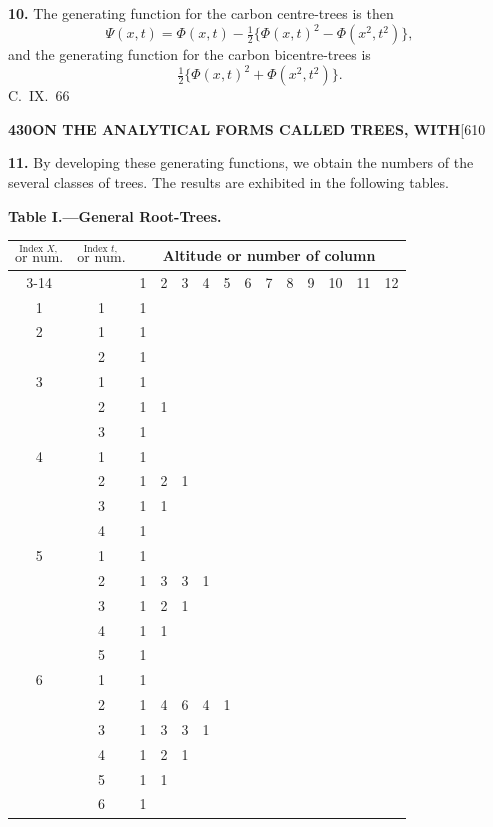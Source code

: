 \documentclass[11pt,a4paper]{book}
\begin{document}
{\medskip
\noindent\textbf{10.}
The generating function for the carbon centre-trees is then
\[
\Psi(x,t) = \Phi(x,t) - \tfrac{1}{2}\{\Phi(x,t)^2 - \Phi(x^2,t^2)\},
\]
and the generating function for the carbon bicentre-trees is
\[
\tfrac{1}{2}\{\Phi(x,t)^2 + \Phi(x^2,t^2)\}.
\]
\hfill C.~IX.\ 66

\newpage
\noindent\textbf{430}\hspace{\fill}\textbf{ON THE ANALYTICAL FORMS CALLED TREES, WITH}\hspace{\fill}[610

\noindent\textbf{11.}
By developing these generating functions, we obtain the numbers of the several classes of trees. The results are exhibited in the following tables.

\medskip
\noindent\textbf{Table I.---General Root-Trees.}

\begin{center}
\small
\begin{longtable}{|c|c|*{12}{c|}}
\hline
\multirow{2}{*}{$\stackrel{\text{Index }X,}{\text{or num.}}$} &
\multirow{2}{*}{$\stackrel{\text{Index }t,}{\text{or num.}}$} &
\multicolumn{12}{c|}{Altitude or number of column} \\
\cline{3-14}
& & 1 & 2 & 3 & 4 & 5 & 6 & 7 & 8 & 9 & 10 & 11 & 12 \\
\hline
\endfirsthead
\hline
1 & 1 & 1 & & & & & & & & & & & \\
\hline
2 & 1 & 1 & & & & & & & & & & & \\
  & 2 & 1 & & & & & & & & & & & \\
\hline
3 & 1 & 1 & & & & & & & & & & & \\
  & 2 & 1 & 1 & & & & & & & & & & \\
  & 3 & 1 & & & & & & & & & & & \\
\hline
4 & 1 & 1 & & & & & & & & & & & \\
  & 2 & 1 & 2 & 1 & & & & & & & & & \\
  & 3 & 1 & 1 & & & & & & & & & & \\
  & 4 & 1 & & & & & & & & & & & \\
\hline
5 & 1 & 1 & & & & & & & & & & & \\
  & 2 & 1 & 3 & 3 & 1 & & & & & & & & \\
  & 3 & 1 & 2 & 1 & & & & & & & & & \\
  & 4 & 1 & 1 & & & & & & & & & & \\
  & 5 & 1 & & & & & & & & & & & \\
\hline
6 & 1 & 1 & & & & & & & & & & & \\
  & 2 & 1 & 4 & 6 & 4 & 1 & & & & & & & \\
  & 3 & 1 & 3 & 3 & 1 & & & & & & & & \\
  & 4 & 1 & 2 & 1 & & & & & & & & & \\
  & 5 & 1 & 1 & & & & & & & & & & \\
  & 6 & 1 & & & & & & & & & & & \\
\hline
\end{longtable}
\end{center}

}
\end{document}
